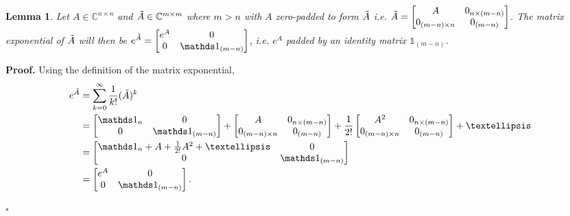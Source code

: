 \documentclass[12pt]{article}
\newtheorem{lem}{Lemma}
\newenvironment{pf}{\noindent\textbf{Proof.}}{\hfill$\square$}
\begin{document}
\begin{lem}
\label{matrix_exp_identity}
Let $A \in \mathbb{C}^{n \times n}$ and $\Tilde{A} \in \mathbb{C}^{m \times m}$ where $m>n$ with $A$ zero-padded to form $\Tilde{A}$ i.e. $\Tilde{A} = \begin{bmatrix}
  A & 0_{n \times (m-n)}\\ 
  0_{(m-n)\times n} & 0_{(m-n)}
\end{bmatrix}$. The matrix exponential of $\Tilde{A}$ will then be $e^{\Tilde{A}} = \begin{bmatrix}
  e^{A} & 0\\ 
  0 & \mathds 1_{(m-n)}
\end{bmatrix}$, i.e. $e^{A}$ padded by an identity matrix $\mathds 1_{(m-n)} $.
\end{lem}
\begin{pf} 
Using the definition of the matrix exponential, 
\begin{align*}
   e^{\Tilde{A}} &=  \sum_{k=0}^{\infty} \frac{1}{k!}(\Tilde{A})^{k} 
   \\ &= \begin{bmatrix}
  \mathds 1_{n} & 0\\ 
  0 & \mathds 1_{(m-n)}\end{bmatrix} + \begin{bmatrix}
  A & 0_{n \times (m-n)}\\ 
  0_{(m-n)\times n} & 0_{(m-n)}\end{bmatrix} + \frac{1}{2!}\begin{bmatrix}
  A^2 & 0_{n \times (m-n)}\\ 
  0_{(m-n)\times n} & 0_{(m-n)}\end{bmatrix} +\dots 
  \\ &= \begin{bmatrix}
  \mathds 1_{n} + A +  \frac{1}{2!}A^2 +\dots & 0\\ 
  0 & \mathds 1_{(m-n)}\end{bmatrix}
  \\ &= \begin{bmatrix}
  e^{A} & 0\\ 
  0 & \mathds 1_{(m-n)}
  \end{bmatrix}.
\end{align*}

\end{pf} 
\end{document}
